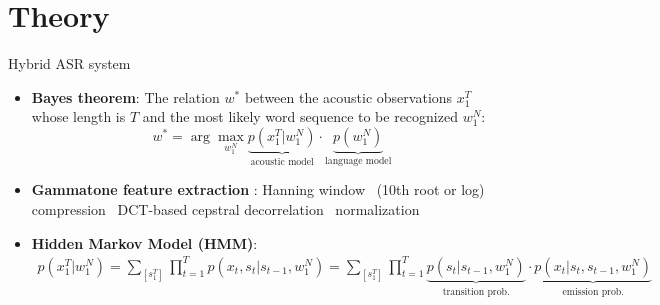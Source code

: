 \section{Theory}

\begin{frame}{Hybrid ASR system \cite{RASR-hybrid_vs_attention}}

\begin{itemize}
    \item \textbf{Bayes theorem}: The relation $w^{*}$ between the acoustic observations $x_{1}^{T}$ whose length is $T$ and the most likely word sequence to be recognized $w_{1}^{N}$:
    \begin{equation}
    w^{*} = \operatorname{arg}\max_{w_1^N}  \underbrace{p(x_{1}^{T}|w_{1}^{N})}_{\text{acoustic model}}\cdot\underbrace{p(w_{1}^{N})}_{\text{language model}}
    \end{equation}
    
    \item \textbf{Gammatone feature extraction} \cite{schlueter:icassp07}:
    Hanning window \textrightarrow \, (10th root or log) compression \textrightarrow \, DCT-based cepstral decorrelation \textrightarrow \, normalization
    
    \item \textbf{Hidden Markov Model (HMM)}:
    \begin{align}
    	\label{eq:hmm}
    	p(x_1^T|w_1^N) = \sum_{[s_1^T]}\prod_{t=1}^Tp(x_t, s_t|s_{t-1}, w_1^N) =
    	\sum_{[s_1^T]}\prod_{t=1}^T\underbrace{p(s_t|s_{t-1}, w_1^N)}_{\text{transition prob.}}\cdot
    	\underbrace{p(x_t|s_t, s_{t-1}, w_1^N)}_{\text{emission prob.}}
    \end{align}

\end{itemize}


\end{frame}

